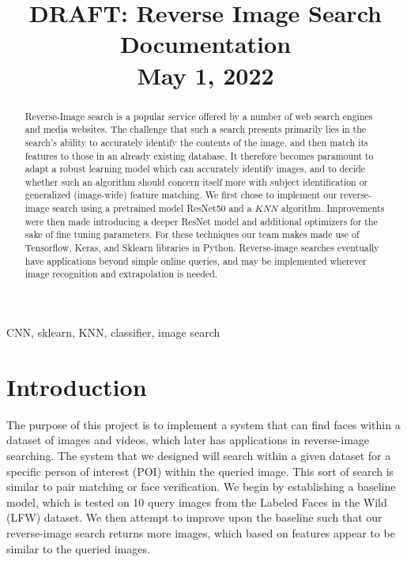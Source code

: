 \documentclass[conference]{IEEEtran}
\begin{document}
\title{DRAFT: Reverse Image Search Documentation\\{\footnotesize May 1, 2022}}

\author{
\and
{}
\and
{}
}

\maketitle

\begin{abstract}
Reverse-Image search is a popular service offered by a number of web search engines and media websites. The challenge that such a search presents primarily lies in the search's ability to accurately identify the contents of the image, and then match its features to those in an already existing database. It therefore becomes paramount to adapt a robust learning model which can accurately identify images, and to decide whether such an algorithm should concern itself more with subject identification or generalized (image-wide) feature matching. We first chose to implement our reverse-image search using a pretrained model ResNet50 and a $KNN$ algorithm. Improvements were then made introducing a deeper ResNet model and additional optimizers for the sake of fine tuning parameters. For these techniques our team makes made use of Tensorflow, Keras, and Sklearn libraries in Python. Reverse-image searches eventually have applications beyond simple online queries, and may be implemented wherever image recognition and extrapolation is needed.
\end{abstract}

\begin{IEEEkeywords}
CNN, sklearn, KNN, classifier, image search
\end{IEEEkeywords}

\section{Introduction}

The purpose of this project is to implement a system that can find faces within a dataset of images and videos, which later has applications in reverse-image searching. The system that we designed will search within a given dataset for a specific person of interest (POI) within the queried image. This sort of search is similar to pair matching or face verification. We begin by establishing a baseline model, which is tested on 10 query images from the Labeled Faces in the Wild (LFW) dataset. We then attempt to improve upon the baseline such that our reverse-image search returns more images, which based on features appear to be similar to the queried images.
\end{document}
